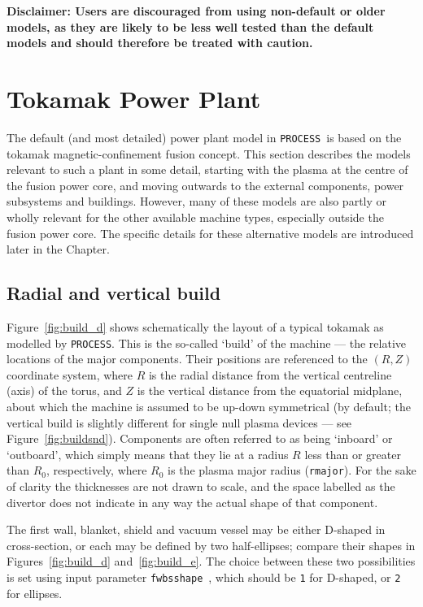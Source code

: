 \documentclass[11pt,a4paper]{report}
\newcommand{\process}{\mbox{\texttt{PROCESS}}}
\begin{document}
\textbf{Disclaimer: Users are discouraged from using non-default or older
models, as they are likely to be less well tested than the default models and
should therefore be treated with caution.}

\section{Tokamak Power Plant}

The default (and most detailed) power plant model in \process\ is based on the
tokamak magnetic-confinement fusion concept. This section describes the models
relevant to such a plant in some detail, starting with the plasma at the
centre of the fusion power core, and moving outwards to the external
components, power subsystems and buildings. However, many of these models are
also partly or wholly relevant for the other available machine types,
especially outside the fusion power core. The specific details for these
alternative models are introduced later in the Chapter.

\subsection{Radial and vertical build}

Figure~\ref{fig:build_d} shows schematically the layout of a typical tokamak
as modelled by \process. This is the so-called `build' of the machine --- the
relative locations of the major components. Their positions are referenced to
the $(R,Z)$ coordinate system, where $R$ is the radial distance from the
vertical centreline (axis) of the torus, and $Z$ is the vertical distance from
the equatorial midplane, about which the machine is assumed to be up-down
symmetrical (by default; the vertical build is slightly different for single
null plasma devices --- see Figure~\ref{fig:buildsnd}). Components are often
referred to as being `inboard' or `outboard', which simply means that they lie
at a radius $R$ less than or greater than $R_0$, respectively, where $R_0$ is
the plasma major radius (\texttt{rmajor}). For the sake of clarity the
thicknesses are not drawn to scale, and the space labelled as the divertor
does not indicate in any way the actual shape of that component.

The first wall, blanket, shield and vacuum vessel may be either D-shaped in
cross-section, or each may be defined by two half-ellipses; compare their
shapes in Figures~\ref{fig:build_d} and~\ref{fig:build_e}. The choice between
these two possibilities is set using input parameter
\texttt{fwbsshape}~\cite{fwbsshape}, which should be \texttt{1} for D-shaped,
or \texttt{2} for ellipses.
\end{document}
